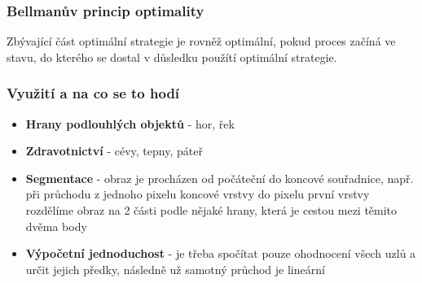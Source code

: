 \documentclass{beamer}
\begin{document}

	\begin{frame}[t,fragile]
		\frametitle{Bellmanův princip optimality}	

		Zbývající část optimální strategie je rovněž optimální, pokud proces začíná ve stavu, do kterého se dostal v důsledku použítí optimální strategie.
			
	\end{frame}
	
	
	\begin{frame}[t,fragile]
		\frametitle{Využití a na co se to hodí}	

		\begin{itemize}
			\item \textbf{Hrany podlouhlých objektů} - hor, řek
			\item \textbf{Zdravotnictví} - cévy, tepny, páteř
			\item \textbf{Segmentace} - obraz je procházen od počáteční do koncové souřadnice, např. při průchodu z jednoho pixelu koncové vrstvy do pixelu první vrstvy rozdělíme obraz na 2 části podle nějaké hrany, která je cestou mezi těmito dvěma body
			\item \textbf{Výpočetní jednoduchost} - je třeba spočítat pouze ohodnocení všech uzlů a určit jejich předky, následně už samotný průchod je lineární
		\end{itemize}
		
	\end{frame}
	
\end{document}
